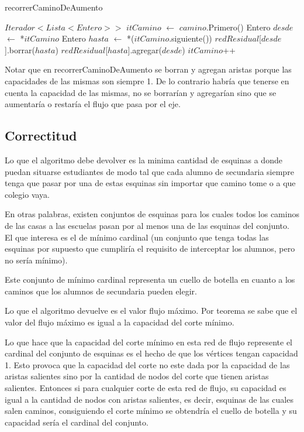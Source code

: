 \begin{algorithm}[]
	\caption{recorrerCaminoDeAumento}

	$Iterador<Lista<Entero>>$ $itCamino$ $\gets$ $camino$.Primero() \;
	 {
		Entero $desde$ $\gets$ *$itCamino$ \;
		Entero $hasta$ $\gets$ *($itCamino$.siguiente()) \;
		$redResidual$[$desde$].borrar($hasta$) \;
		$redResidual$[$hasta$].agregar($desde$) \;
		$itCamino$++ \;
	}
\end{algorithm}

Notar que en recorrerCaminoDeAumento se borran y agregan aristas porque las
capacidades de las mismas son siempre 1. De lo contrario habría que tenerse en
cuenta la capacidad de las mismas, no se borrarían y agregarían sino que se
aumentaría o restaría el flujo que pasa por el eje.

\subsection{Correctitud}

Lo que el algoritmo debe devolver es la minima cantidad de esquinas a donde
puedan situarse estudiantes de modo tal que cada alumno de secundaria siempre
tenga que pasar por una de estas esquinas sin importar que camino tome o a que
colegio vaya.

En otras palabras, existen conjuntos de esquinas para los cuales todos los
caminos de las casas a las escuelas pasan por al menos una de las esquinas del
conjunto. El que interesa es el de mínimo cardinal (un conjunto que tenga
todas las esquinas por supuesto que cumpliría el requisito de interceptar los
alumnos, pero no sería mínimo).

Este conjunto de mínimo cardinal representa un cuello de botella en cuanto a
los caminos que los alumnos de secundaria pueden elegir.

Lo que el algoritmo devuelve es el valor flujo máximo. Por teorema se sabe que
el valor del flujo máximo es igual a la capacidad del corte mínimo.

Lo que hace que la capacidad del corte mínimo en esta red de flujo represente
el cardinal del conjunto de esquinas es el hecho de que los vértices tengan
capacidad 1. Esto provoca que la capacidad del corte no este dada por la
capacidad de las aristas salientes sino por la cantidad de nodos del corte que
tienen aristas salientes. Entonces si para cualquier corte de esta red de
flujo, su capacidad es igual a la cantidad de nodos con aristas salientes, es
decir, esquinas de las cuales salen caminos, consiguiendo el corte mínimo se
obtendría el cuello de botella y su capacidad sería el cardinal del conjunto.

